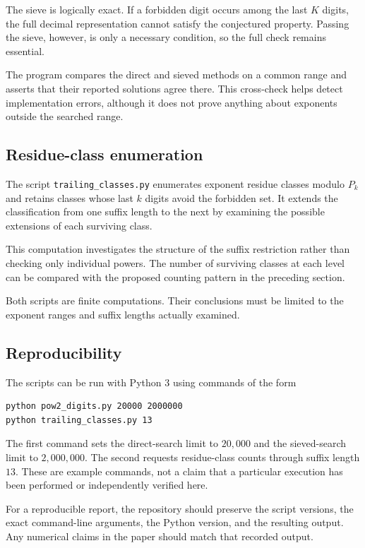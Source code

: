 \documentclass[11pt,a4paper]{article}
\theoremstyle{definition}
\theoremstyle{plain}
\theoremstyle{remark}
\begin{document}
The sieve is logically exact. If a forbidden digit occurs among
the last \(K\) digits, the full decimal representation cannot
satisfy the conjectured property. Passing the sieve, however,
is only a necessary condition, so the full check remains essential.

The program compares the direct and sieved methods on a common
range and asserts that their reported solutions agree there.
This cross-check helps detect implementation errors, although
it does not prove anything about exponents outside the searched
range.

\subsection{Residue-class enumeration}

The script \texttt{trailing\_classes.py} enumerates exponent
residue classes modulo \(P_k\) and retains classes whose last
\(k\) digits avoid the forbidden set. It extends the classification
from one suffix length to the next by examining the possible
extensions of each surviving class.

This computation investigates the structure of the suffix
restriction rather than checking only individual powers. The
number of surviving classes at each level can be compared with
the proposed counting pattern in the preceding section.

Both scripts are finite computations. Their conclusions must
be limited to the exponent ranges and suffix lengths actually
examined.

\subsection{Reproducibility}

The scripts can be run with Python 3 using commands of the form
\begin{verbatim}
python pow2_digits.py 20000 2000000
python trailing_classes.py 13
\end{verbatim}

The first command sets the direct-search limit to \(20{,}000\)
and the sieved-search limit to \(2{,}000{,}000\). The second
requests residue-class counts through suffix length \(13\).
These are example commands, not a claim that a particular
execution has been performed or independently verified here.

For a reproducible report, the repository should preserve the
script versions, the exact command-line arguments, the Python
version, and the resulting output. Any numerical claims in the
paper should match that recorded output.
\end{document}
